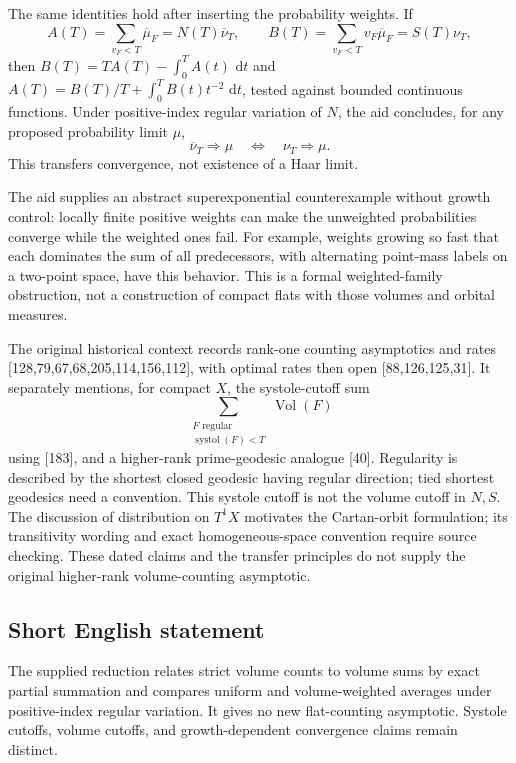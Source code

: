 \documentclass[11pt]{article}
\newcommand{\dd}{\,\mathrm{d}}
\begin{document}
The same identities hold after inserting the probability weights. If
\[
 A(T)=\sum_{v_F<T}\overline\mu_F=N(T)\overline\nu_T,\qquad
 B(T)=\sum_{v_F<T}v_F\overline\mu_F=S(T)\nu_T,
\]
then \(B(T)=TA(T)-\int_0^TA(t)\,\dd t\) and \(A(T)=B(T)/T+\int_0^TB(t)t^{-2}\,\dd t\), tested against bounded continuous functions. Under positive-index regular variation of \(N\), the aid concludes, for any proposed probability limit \(\mu\),
\[
 \overline\nu_T\Longrightarrow\mu\quad\Longleftrightarrow\quad\nu_T\Longrightarrow\mu.
\]
This transfers convergence, not existence of a Haar limit.

The aid supplies an abstract superexponential counterexample without growth control: locally finite positive weights can make the unweighted probabilities converge while the weighted ones fail. For example, weights growing so fast that each dominates the sum of all predecessors, with alternating point-mass labels on a two-point space, have this behavior. This is a formal weighted-family obstruction, not a construction of compact flats with those volumes and orbital measures.

The original historical context records rank-one counting asymptotics and rates [128,79,67,68,205,114,156,112], with optimal rates then open [88,126,125,31]. It separately mentions, for compact \(X\), the systole-cutoff sum
\[
 \sum_{\substack{F\text{ regular}\\\operatorname{systol}(F)<T}}\operatorname{Vol}(F)
\]
using [183], and a higher-rank prime-geodesic analogue [40]. Regularity is described by the shortest closed geodesic having regular direction; tied shortest geodesics need a convention. This systole cutoff is not the volume cutoff in \(N,S\). The discussion of distribution on \(T^1X\) motivates the Cartan-orbit formulation; its transitivity wording and exact homogeneous-space convention require source checking. These dated claims and the transfer principles do not supply the original higher-rank volume-counting asymptotic.
\subsection{Short English statement}
The supplied reduction relates strict volume counts to volume sums by exact partial summation and compares uniform and volume-weighted averages under positive-index regular variation. It gives no new flat-counting asymptotic. Systole cutoffs, volume cutoffs, and growth-dependent convergence claims remain distinct.
\end{document}
